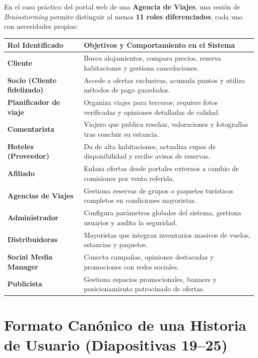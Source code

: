 \begin{ejemplo}
En el caso práctico del portal web de una \textbf{Agencia de Viajes}, una sesión de \textit{Brainstorming} permite distinguir al menos \textbf{11 roles diferenciados}, cada uno con necesidades propias:
\begin{center}
\renewcommand{\arraystretch}{1.25}
\begin{tabularx}{\textwidth}{>{\bfseries\color{mdaPrimary}}p{4.2cm} X}
\toprule
\rowcolor{mdaLightAccent}
\textbf{Rol Identificado} & \textbf{Objetivos y Comportamiento en el Sistema} \\
\midrule
Cliente & Busca alojamientos, compara precios, reserva habitaciones y gestiona cancelaciones. \\
Socio (Cliente fidelizado) & Accede a ofertas exclusivas, acumula puntos y utiliza métodos de pago guardados. \\
Planificador de viaje & Organiza viajes para terceros; requiere fotos verificadas y opiniones detalladas de calidad. \\
Comentarista & Viajero que publica reseñas, valoraciones y fotografías tras concluir su estancia. \\
Hoteles (Proveedor) & Da de alta habitaciones, actualiza cupos de disponibilidad y recibe avisos de reservas. \\
Afiliado & Enlaza ofertas desde portales externos a cambio de comisiones por venta referida. \\
Agencias de Viajes & Gestiona reservas de grupos o paquetes turísticos completos en condiciones mayoristas. \\
Administrador & Configura parámetros globales del sistema, gestiona usuarios y audita la seguridad. \\
Distribuidoras & Mayoristas que integran inventarios masivos de vuelos, estancias y paquetes. \\
Social Media Manager & Conecta campañas, opiniones destacadas y promociones con redes sociales. \\
Publicista & Gestiona espacios promocionales, banners y posicionamiento patrocinado de ofertas. \\
\bottomrule
\end{tabularx}
\renewcommand{\arraystretch}{1.0}
\end{center}
\end{ejemplo}

\section{Formato Canónico de una Historia de Usuario (Diapositivas 19--25)}

